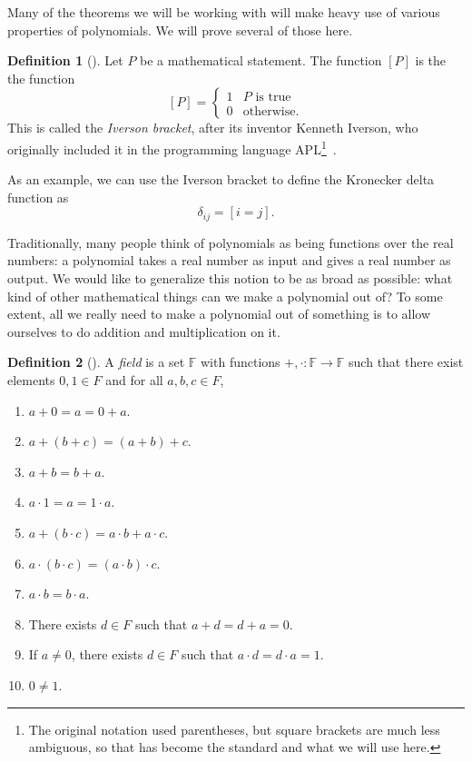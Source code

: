 \documentclass[english,12pt]{reedthesis}
\theoremstyle{plain}
\theoremstyle{definition}
\newtheorem{defn}[defn]{Definition}
\theoremstyle{remark}
\begin{document}
Many of the theorems we will be working with will make heavy use of various
properties of polynomials. We will prove several of those here.

\begin{defn}[{\cite{Knu92}}]\label{def:iverson-bracket}
  Let $P$ be a mathematical statement. The function $[P]$ is the the function
  \begin{equation}\label{eqn:iverson-bracket}
    [P] = \begin{cases}
      1 & P \text{ is true} \\
      0 & \text{otherwise.}
    \end{cases}
  \end{equation}
  This is called the \emph{Iverson bracket}, after its inventor Kenneth Iverson,
  who originally included it in the programming language APL\footnote{The
    original notation used parentheses, but square brackets are much less
    ambiguous, so that has become the standard and what we will use
    here.}~\cite[11]{APL}.
\end{defn}

As an example, we can use the Iverson bracket to define the Kronecker delta
function as
\[
  \delta_{ij} = [i = j].
\]

Traditionally, many people think of polynomials as being functions over the real
numbers: a polynomial takes a real number as input and gives a real number as
output. We would like to generalize this notion to be as broad as possible:
what kind of other mathematical things can we make a polynomial out of? To some
extent, all we really need to make a polynomial out of something is to allow
ourselves to do addition and multiplication on it.

\begin{defn}[{\cite[Def.\ 2.6.1]{Swan21}}]\label{def:field}
  A \emph{field} is a set $\mathbb{F}$ with functions
  $+, \cdot\colon \mathbb{F} \rightarrow \mathbb{F}$ such that there exist elements $0, 1 \in F$
  and for all $a, b, c \in F$,
  \begin{enumerate}
    \item $a + 0 = a = 0 + a$.
    \item $a + (b + c) = (a + b) + c$.
    \item $a + b = b + a$.
    \item $a \cdot 1 = a = 1 \cdot a$.
    \item $a + (b \cdot c) = a \cdot b + a \cdot c$.
    \item $a \cdot (b \cdot c) = (a \cdot b) \cdot c$.
    \item $a \cdot b = b \cdot a$.
    \item There exists $d \in F$ such that $a + d = d + a = 0$.
    \item If $a \ne 0$, there exists $d \in F$ such that $a \cdot d = d \cdot a = 1$.
    \item $0 \ne 1$.
  \end{enumerate}
\end{defn}
\end{document}
